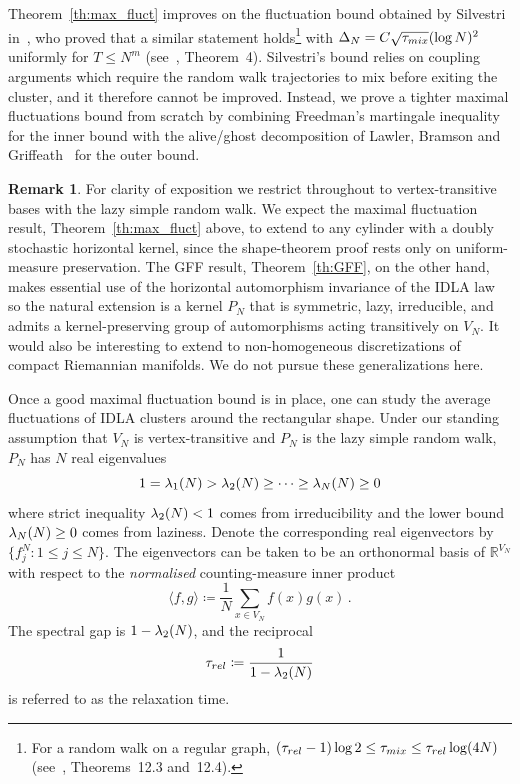 \documentclass[11pt,a4paper,reqno]{amsart}
\theoremstyle{definition}
\newtheorem{Remark}[Theorem]{Remark}
\newcommand{\bbR}{{\ensuremath{\mathbb R}} }
\begin{document}
Theorem~\ref{th:max_fluct} improves on the fluctuation bound obtained by Silvestri in~\cite{silvestri2020internal}, who proved that a similar statement holds\footnote{For a random walk on a regular graph, $(\tau_{rel} - 1) \log 2 \leq \tau_{mix} \leq \tau_{rel} \log(4N)$ (see~\cite{levin2017markov}, Theorems~12.3 and~12.4).} with $\Delta_N = C \sqrt{\tau_{mix}} (\log N)^2$ uniformly for $T \leq N^m$ (see~\cite{silvestri2020internal}, Theorem~4). 
Silvestri's bound relies on coupling arguments which require the random walk trajectories to mix before exiting the cluster, and it therefore cannot be improved. Instead, we prove a tighter maximal fluctuations bound from scratch by combining Freedman's martingale inequality~\cite{freedman1975tail} for the inner bound with the alive/ghost decomposition of Lawler, Bramson and Griffeath~\cite{lawler1992internal} for the outer bound. 


\begin{Remark}
	For clarity of exposition we restrict throughout to vertex-transitive bases with the lazy simple random walk. We expect the maximal fluctuation result, Theorem~\ref{th:max_fluct} above, to extend to any cylinder with a doubly stochastic horizontal kernel, since the shape-theorem proof rests only on uniform-measure preservation. The GFF result, Theorem~\ref{th:GFF}, on the other hand, makes essential use of the horizontal automorphism invariance of the IDLA law so the natural extension is a kernel $P_N$ that is symmetric, lazy, irreducible, and admits a kernel-preserving group of automorphisms acting transitively on $V_N$. It would also be interesting to extend to non-homogeneous discretizations of compact Riemannian manifolds. We do not pursue these generalizations here.
\end{Remark}


\medskip

Once a good maximal fluctuation bound is in place, one can study the average fluctuations of IDLA clusters around the rectangular shape. Under our standing assumption that $V_N$ is vertex-transitive and $P_N$ is the lazy simple random walk, $P_N$ has $N$ real eigenvalues
	\begin{equation}\label{eq:eigenvalues}
	 1 = \lambda_1(N) > \lambda_2(N) \geq \cdots \geq \lambda_N(N) \geq 0
	\end{equation}
where strict inequality $\lambda_2(N) < 1$ comes from irreducibility and the lower bound $\lambda_N(N) \geq 0$ comes from laziness. Denote the  corresponding real eigenvectors by $\{ f^N_j : 1\leq j \leq N\}$. The eigenvectors can be taken to be an orthonormal basis of $\bbR^{V_N}$ with respect to the {\em normalised} counting-measure inner product
	\begin{equation}\label{eq:product}
	 \langle f , g \rangle \coloneqq \frac 1N \sum_{x \in V_N } f(x) g(x)\,.
	 \end{equation}
The spectral gap is $1 - \lambda_2(N)$, and the reciprocal
	\[ \tau_{rel} \coloneqq \frac{1}{1-\lambda_2(N)} \]
is referred to as the relaxation time.
\end{document}
